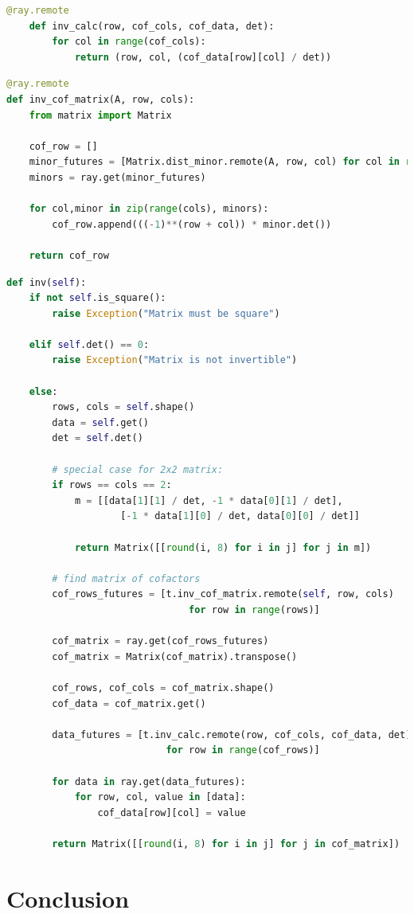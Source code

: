 \begin{lstlisting}[language=Python, caption={inv\_calc}]
    @ray.remote
    def inv_calc(row, cof_cols, cof_data, det):
        for col in range(cof_cols):
            return (row, col, (cof_data[row][col] / det))
    \end{lstlisting}
\pagebreak
\begin{lstlisting}[language=Python, caption={inv\_cof\_matrix}]
@ray.remote
def inv_cof_matrix(A, row, cols):
    from matrix import Matrix
    
    cof_row = []
    minor_futures = [Matrix.dist_minor.remote(A, row, col) for col in range(cols)]
    minors = ray.get(minor_futures)

    for col,minor in zip(range(cols), minors):
        cof_row.append(((-1)**(row + col)) * minor.det())

    return cof_row
\end{lstlisting}
\begin{lstlisting}[language=Python, caption={Parallelized inverse function}]
def inv(self):
    if not self.is_square():
        raise Exception("Matrix must be square")

    elif self.det() == 0:
        raise Exception("Matrix is not invertible")

    else:
        rows, cols = self.shape()
        data = self.get()
        det = self.det()

        # special case for 2x2 matrix:
        if rows == cols == 2:
            m = [[data[1][1] / det, -1 * data[0][1] / det],
                    [-1 * data[1][0] / det, data[0][0] / det]]

            return Matrix([[round(i, 8) for i in j] for j in m])

        # find matrix of cofactors
        cof_rows_futures = [t.inv_cof_matrix.remote(self, row, cols) 
                                for row in range(rows)]
        
        cof_matrix = ray.get(cof_rows_futures)
        cof_matrix = Matrix(cof_matrix).transpose()

        cof_rows, cof_cols = cof_matrix.shape()
        cof_data = cof_matrix.get()

        data_futures = [t.inv_calc.remote(row, cof_cols, cof_data, det) 
                            for row in range(cof_rows)]

        for data in ray.get(data_futures):
            for row, col, value in [data]:
                cof_data[row][col] = value

        return Matrix([[round(i, 8) for i in j] for j in cof_matrix])
\end{lstlisting}



\section{Conclusion}

